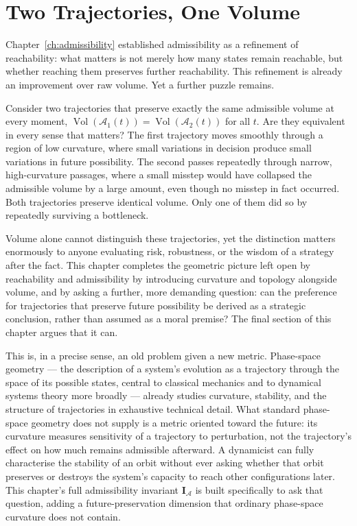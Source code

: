 \documentclass[12pt,twoside,openright]{book}
\newcommand{\adm}{\mathcal{A}}
\newcommand{\Vol}{\operatorname{Vol}}
\begin{document}
\section{Two Trajectories, One Volume}
\label{sec:ch15-why}

Chapter~\ref{ch:admissibility} established admissibility as
a refinement of reachability: what matters is not merely how
many states remain reachable, but whether reaching them
preserves further reachability. This refinement is already
an improvement over raw volume. Yet a further puzzle
remains.

Consider two trajectories that preserve exactly the same
admissible volume at every moment,
$\Vol(\adm_1(t))=\Vol(\adm_2(t))$ for all $t$. Are they
equivalent in every sense that matters? The first trajectory
moves smoothly through a region of low curvature, where
small variations in decision produce small variations in
future possibility. The second passes repeatedly through
narrow, high-curvature passages, where a small misstep would
have collapsed the admissible volume by a large amount, even
though no misstep in fact occurred. Both trajectories
preserve identical volume. Only one of them did so by
repeatedly surviving a bottleneck.

Volume alone cannot distinguish these trajectories, yet the
distinction matters enormously to anyone evaluating risk,
robustness, or the wisdom of a strategy after the fact. This
chapter completes the geometric picture left open by
reachability and admissibility by introducing curvature and
topology alongside volume, and by asking a further, more
demanding question: can the preference for trajectories that
preserve future possibility be derived as a strategic
conclusion, rather than assumed as a moral premise? The
final section of this chapter argues that it can.

This is, in a precise sense, an old problem given a new
metric. Phase-space geometry --- the description of a
system's evolution as a trajectory through the space of its
possible states, central to classical mechanics and to
dynamical systems theory more broadly
\parencite{arnold1989,strogatz2015} --- already studies
curvature, stability, and the structure of trajectories in
exhaustive technical detail. What standard phase-space
geometry does not supply is a metric oriented toward the
future: its curvature measures sensitivity of a trajectory to
perturbation, not the trajectory's effect on how much remains
admissible afterward. A dynamicist can fully characterise the
stability of an orbit without ever asking whether that orbit
preserves or destroys the system's capacity to reach other
configurations later. This chapter's full admissibility
invariant $\mathbf{I}_\adm$ is built specifically to ask that
question, adding a future-preservation dimension that ordinary
phase-space curvature does not contain.
\end{document}
